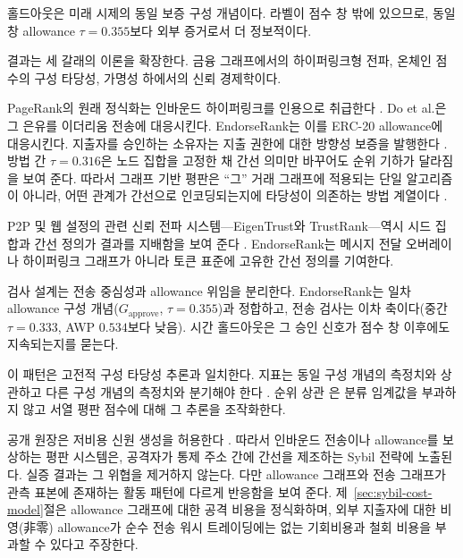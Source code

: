 홀드아웃은 미래 시제의 동일 보증 구성 개념이다. 라벨이 점수 창 밖에 있으므로, 동일 창 allowance $\tau=0.355$보다 외부 증거로서 더 정보적이다.


결과는 세 갈래의 이론을 확장한다. 금융 그래프에서의 하이퍼링크형 전파, 온체인 점수의 구성 타당성, 가명성 하에서의 신뢰 경제학이다.


PageRank의 원래 정식화는 인바운드 하이퍼링크를 인용으로 취급한다 . Do et al.은 그 은유를 이더리움 전송에 대응시킨다. EndorseRank는 이를 ERC-20 allowance에 대응시킨다. 지출자를 승인하는 소유자는 지출 권한에 대한 방향성 보증을 발행한다 . 방법 간 $\tau=0.316$은 노드 집합을 고정한 채 간선 의미만 바꾸어도 순위 기하가 달라짐을 보여 준다. 따라서 그래프 기반 평판은 ``그'' 거래 그래프에 적용되는 단일 알고리즘이 아니라, 어떤 관계가 간선으로 인코딩되는지에 타당성이 의존하는 방법 계열이다 .

P2P 및 웹 설정의 관련 신뢰 전파 시스템---EigenTrust와 TrustRank---역시 시드 집합과 간선 정의가 결과를 지배함을 보여 준다 . EndorseRank는 메시지 전달 오버레이나 하이퍼링크 그래프가 아니라 토큰 표준에 고유한 간선 정의를 기여한다.


검사 설계는 전송 중심성과 allowance 위임을 분리한다. EndorseRank는 일차 allowance 구성 개념($G_{\text{approve}}$, $\tau=0.355$)과 정합하고, 전송 검사는 이차 축이다(중간 $\tau=0.333$, AWP $0.534$보다 낮음). 시간 홀드아웃은 그 승인 신호가 점수 창 이후에도 지속되는지를 묻는다.

이 패턴은 고전적 구성 타당성 추론과 일치한다. 지표는 동일 구성 개념의 측정치와 상관하고 다른 구성 개념의 측정치와 분기해야 한다 . 순위 상관 은 분류 임계값을 부과하지 않고 서열 평판 점수에 대해 그 추론을 조작화한다.


공개 원장은 저비용 신원 생성을 허용한다 . 따라서 인바운드 전송이나 allowance를 보상하는 평판 시스템은, 공격자가 통제 주소 간에 간선을 제조하는 Sybil 전략에 노출된다. 실증 결과는 그 위협을 제거하지 않는다. 다만 allowance 그래프와 전송 그래프가 관측 표본에 존재하는 활동 패턴에 다르게 반응함을 보여 준다. 제~\ref{sec:sybil-cost-model}절은 allowance 그래프에 대한 공격 비용을 정식화하며, 외부 지출자에 대한 비영(非零) allowance가 순수 전송 워시 트레이딩에는 없는 기회비용과 철회 비용을 부과할 수 있다고 주장한다.

